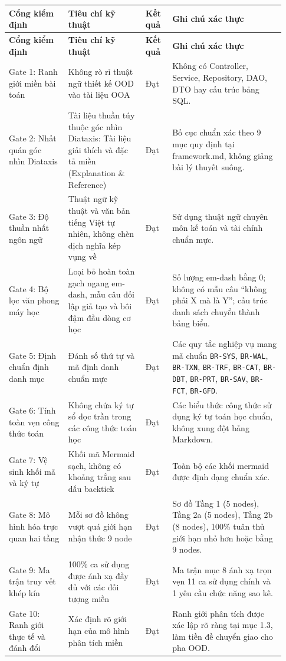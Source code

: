 \documentclass[11pt,a4paper]{article}
\newcommand{\code}[1]{\texttt{#1}}
\newcommand{\lthead}[1]{%
  \hline#1\\\hline\endfirsthead
  \hline#1\\\hline\endhead
}
\newenvironment{smalltable}{\begingroup\footnotesize\renewcommand{\arraystretch}{1.25}\setlength{\tabcolsep}{3pt}}{\endgroup}
\begin{document}
\begin{smalltable}
\begin{longtable}{|L{0.20\linewidth}|L{0.26\linewidth}|L{0.09\linewidth}|L{0.38\linewidth}|}
\lthead{\textbf{Cổng kiểm định} & \textbf{Tiêu chí kỹ thuật} & \textbf{Kết quả} & \textbf{Ghi chú xác thực}}
Gate 1: Ranh giới miền bài toán & Không rò rỉ thuật ngữ thiết kế OOD vào tài liệu OOA & Đạt & Không có Controller, Service, Repository, DAO, DTO hay cấu trúc bảng SQL. \\ \hline
Gate 2: Nhất quán góc nhìn Diataxis & Tài liệu thuần túy thuộc góc nhìn Diataxis: Tài liệu giải thích và đặc tả miền (Explanation \& Reference) & Đạt & Bố cục chuẩn xác theo 9 mục quy định tại framework.md, không giảng bài lý thuyết suông. \\ \hline
Gate 3: Độ thuần nhất ngôn ngữ & Thuật ngữ kỹ thuật và văn bản tiếng Việt tự nhiên, không chèn dịch nghĩa kép vụng về & Đạt & Sử dụng thuật ngữ chuyên môn kế toán và tài chính chuẩn mực. \\ \hline
Gate 4: Bộ lọc văn phong máy học & Loại bỏ hoàn toàn gạch ngang em-dash, mẫu câu đối lập giả tạo và bôi đậm đầu dòng cơ học & Đạt & Số lượng em-dash bằng 0; không có mẫu câu ``không phải X mà là Y''; cấu trúc danh sách chuyển thành bảng biểu. \\ \hline
Gate 5: Định chuẩn định danh mục & Đánh số thứ tự và mã định danh chuẩn mực & Đạt & Các quy tắc nghiệp vụ mang mã chuẩn \code{BR-SYS}, \code{BR-WAL}, \code{BR-TXN}, \code{BR-TRF}, \code{BR-CAT}, \code{BR-DBT}, \code{BR-PRT}, \code{BR-SAV}, \code{BR-FCT}, \code{BR-GFD}. \\ \hline
Gate 6: Tính toàn vẹn công thức toán & Không chứa ký tự sổ dọc trần trong các công thức toán học & Đạt & Các biểu thức công thức sử dụng ký tự toán học chuẩn, không xung đột bảng Markdown. \\ \hline
Gate 7: Vệ sinh khối mã và ký tự & Khối mã Mermaid sạch, không có khoảng trắng sau dấu backtick & Đạt & Toàn bộ các khối mermaid được định dạng chuẩn xác. \\ \hline
Gate 8: Mô hình hóa trực quan hai tầng & Mỗi sơ đồ không vượt quá giới hạn nhận thức 9 node & Đạt & Sơ đồ Tầng 1 (5 nodes), Tầng 2a (5 nodes), Tầng 2b (8 nodes), 100\% tuân thủ giới hạn nhỏ hơn hoặc bằng 9 nodes. \\ \hline
Gate 9: Ma trận truy vết khép kín & 100\% ca sử dụng được ánh xạ đầy đủ với các đối tượng miền & Đạt & Ma trận mục 8 ánh xạ trọn vẹn 11 ca sử dụng chính và 1 yêu cầu chức năng sao kê. \\ \hline
Gate 10: Ranh giới thực tế và đánh đổi & Xác định rõ giới hạn của mô hình phân tích miền & Đạt & Ranh giới phân tích được xác lập rõ ràng tại mục 1.3, làm tiền đề chuyển giao cho pha OOD. \\ \hline
\end{longtable}
\end{smalltable}
\end{document}
